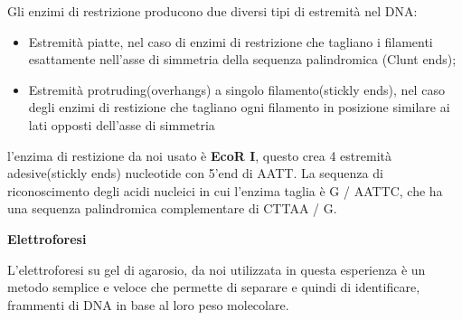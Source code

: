 Gli enzimi di restrizione producono due diversi tipi di estremità nel DNA:
\begin{itemize}
Quest'esperienza in laboratorio si divide in due fasi:

\begin{itemize}

	\item Restrizione del DNA

	\item Preparazione delle componenti per l'elettroforesi

\end{itemize}

Durante la fase di Restrizione del DNA, dobbiamo fare in modo che all'interno del plasmide pUC18 venga inserito il gene di interesse e quello per la resistenza all'ampicillina.
\vspace{0.3cm}

Durante la fase di Preparazione dei componenti per l'elettroforesi invece bisognerà preparare il gel di agarosio, dove poi andranno a correre le due concentrazioni di plasmide, uno digerito e l'altro non digerito.

	\item Estremità piatte, nel caso di enzimi di restrizione che tagliano i filamenti esattamente nell'asse di simmetria della sequenza palindromica (Clunt ends);
	\item Estremità protruding(overhangs) a singolo filamento(stickly ends), nel caso degli enzimi di restizione che tagliano ogni filamento in posizione similare ai lati opposti dell'asse di simmetria

\end{itemize}

l'enzima di restizione da noi usato è \textbf{EcoR I}, questo crea 4 estremità adesive(stickly ends) nucleotide con  5'end  di AATT. La sequenza di riconoscimento degli acidi nucleici in cui l'enzima taglia è G / ​​AATTC, che ha una sequenza palindromica complementare di CTTAA / G.

\vspace{0.5cm}


\textbf{Elettroforesi }

\vspace{0.3cm}



L'elettroforesi su gel di agarosio, da noi utilizzata in questa esperienza è un metodo semplice e veloce che permette di separare e quindi di identificare, frammenti di DNA in base al loro peso molecolare.

